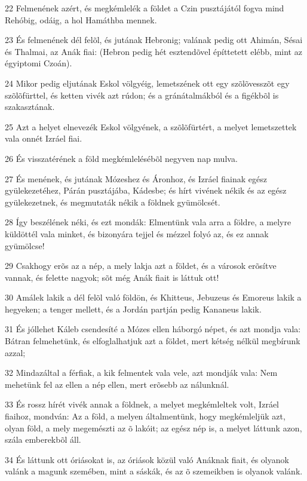 \par 22 Felmenének azért, és megkémlelék a földet a Czin pusztájától fogva mind Rehóbig, odáig, a hol Hamáthba mennek.
\par 23 És felmenének dél felõl, és jutának Hebronig; valának pedig ott Ahimán, Sésai és Thalmai, az Anák fiai: (Hebron pedig hét esztendõvel építtetett elébb, mint az égyiptomi Czoán).
\par 24 Mikor pedig eljutának Eskol völgyéig, lemetszének ott egy szõlõvesszõt egy szõlõfürttel, és ketten vivék azt rúdon; és a gránátalmákból és a figékbõl is szakasztának.
\par 25 Azt a helyet elnevezék Eskol völgyének, a szõlõfürtért, a melyet lemetszettek vala onnét Izráel fiai.
\par 26 És visszatérének a föld megkémlelésébõl negyven nap mulva.
\par 27 És menének, és jutának Mózeshez és Áronhoz, és Izráel fiainak egész gyülekezetéhez, Párán pusztájába, Kádesbe; és hírt vivének nékik és az egész gyülekezetnek, és megmutaták nékik a földnek gyümölcsét.
\par 28 Így beszélének néki, és ezt mondák: Elmentünk vala arra a földre, a melyre küldöttél vala minket, és bizonyára tejjel és mézzel folyó az, és ez annak gyümölcse!
\par 29 Csakhogy erõs az a nép, a mely lakja azt a földet, és a városok erõsítve vannak, és felette nagyok; sõt még Anák fiait is láttuk ott!
\par 30 Amálek lakik a dél felõl való földön, és Khitteus, Jebuzeus és Emoreus lakik a hegyeken; a tenger mellett, és a Jordán partján pedig Kananeus lakik.
\par 31 És jóllehet Káleb csendesíté a Mózes ellen háborgó népet, és azt mondja vala: Bátran felmehetünk, és elfoglalhatjuk azt a földet, mert kétség nélkül megbírunk azzal;
\par 32 Mindazáltal a férfiak, a kik felmentek vala vele, azt mondják vala: Nem mehetünk fel az ellen a nép ellen, mert erõsebb az nálunknál.
\par 33 És rossz hírét vivék annak a földnek, a melyet megkémleltek volt, Izráel fiaihoz, mondván: Az a föld, a melyen általmentünk, hogy megkémleljük azt, olyan föld, a mely megemészti az õ lakóit; az egész nép is, a melyet láttunk azon, szála emberekbõl áll.
\par 34 És láttunk ott óriásokat is, az óriások közül való Anáknak fiait, és olyanok valánk a magunk szemében, mint a sáskák, és az õ szemeikben is olyanok valánk.

